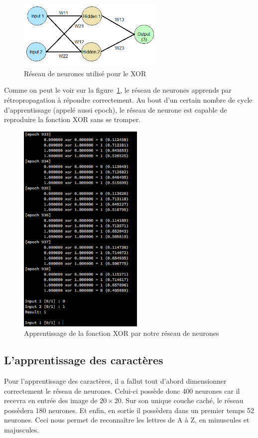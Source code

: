 \documentclass[11pt]{report}
\begin{document}
\begin{figure}[htbp]
\centering
\includegraphics[width=7cm]{xor_neuron.jpg}
\caption{Réseau de neurones utilisé pour le XOR}
\end{figure}

Comme on peut le voir sur la figure~\ref{xor}, le réseau de neurones apprends par rétropropagation à répondre correctement. Au bout d'un certain nombre de cycle d'apprentissage (appelé aussi epoch), le réseau de neurone est capable de reproduire la fonction XOR sans se tromper.

\begin{figure}[htbp]
\centering
\includegraphics[width=6cm]{xor.png}
\caption{Apprentissage de la fonction XOR par notre réseau de neurones}
\label{xor}
\end{figure}

\subsection{L'apprentissage des caractères}

Pour l'apprentissage des caractères, il a fallut tout d'abord dimensionner correctement le réseau de neurones. Celui-ci possède donc 400 neurones car il recevra en entrée des image de $20 \times 20$. Sur son unique couche caché, le réseau possèdera 180 neurones. Et enfin, en sortie il possèdera dans un premier temps 52 neurones. Ceci nous permet de reconnaître les lettres de A à Z, en minuscules et majuscules.
\end{document}
